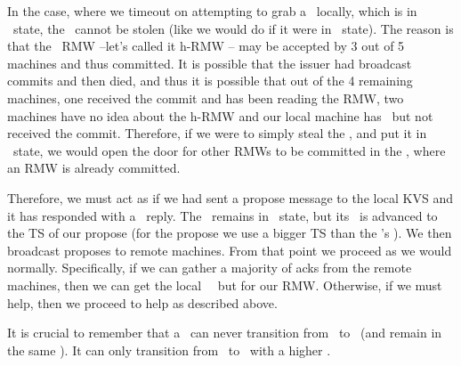 \custvspace
{}
In the case, where we timeout on attempting to grab a \kv~locally, which is in \acced~state, the \kv~cannot be stolen (like we would do if it were in \proped~state).
The reason is that the \acced~RMW --let's called it h-RMW -- may be accepted by 3 out of 5 machines and thus committed. It is possible that the issuer had broadcast commits and then died, and thus it is possible that out of the 4 remaining machines, one received the commit and has been reading the RMW, two machines have no idea about the h-RMW and our local machine has \acced~but not received the commit. Therefore, if we were to simply steal the \kv, and put it in \proped~state, we would open the door for other RMWs to be committed in the \logno, where an RMW is already committed.

Therefore, we must act as if we had sent a propose message to the local KVS and it has responded with a \lowacc~reply. The \kv~remains in \acced~state, but its \propts~is advanced to the TS of our propose (for the propose we use a bigger TS than the \kv's \propts). We then broadcast proposes to remote machines.
From that point we proceed as we would normally. Specifically, if we can gather a majority of acks from the remote machines, then we can get the local \kv~\acced~but for our RMW. Otherwise, if we must help, then we proceed to help as described above.

It is crucial to remember that a \kv~can never transition from \acced~to \proped~(and remain in the same \logno). It can only transition from \acced~to \acced~with a higher \accts.